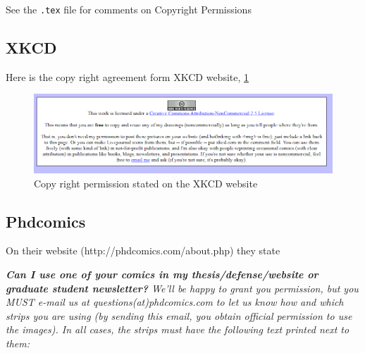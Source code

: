 


See the \verb+.tex+ file for comments on Copyright Permissions

\subsection{XKCD}

Here is the copy right agreement form XKCD website, \ref{fig:CR-XKCD}
\begin{figure}
    \centering
    \includegraphics[width = \textwidth]{figures/Copy-Right-Permissions/XKCD-permission.PNG}
    \caption{Copy right permission stated on the XKCD website}
    \label{fig:CR-XKCD}
\end{figure}

\subsection{Phdcomics}

On their website (http://phdcomics.com/about.php) they state 

\textit{\textbf{Can I use one of your comics in my thesis/defense/website or graduate student newsletter?}
We'll be happy to grant you permission, but you MUST e-mail us at questions(at)phdcomics.com to let us know how and which strips you are using (by sending this email, you obtain official permission to use the images). In all cases, the strips must have the following text printed next to them:}

